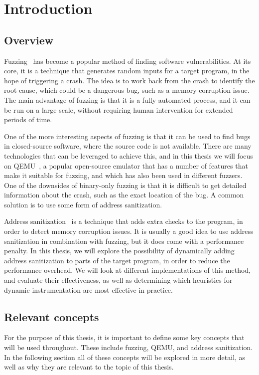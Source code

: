 
\chapter{Introduction}\label{chapter:introduction}

\section{Overview}
Fuzzing~\parencite{manes2019artscienceengineeringfuzzing} has become a popular method of finding software vulnerabilities.
At its core, it is a technique that generates random inputs for a target program, in the hope
of triggering a crash. The idea is to work back from the crash to identify the root cause, which could
be a dangerous bug, such as a memory corruption issue. The main advantage of fuzzing is that it is
a fully automated process, and it can be run on a large scale, without requiring human intervention
for extended periods of time.

One of the more interesting aspects of fuzzing is that it can be used to find bugs in closed-source
software, where the source code is not available. There are many technologies that can be leveraged
to achieve this, and in this thesis we will focus on QEMU~\parencite{269444}, a popular open-source emulator that has
a number of features that make it suitable for fuzzing, and which has also been used in different
fuzzers. One of the downsides of binary-only fuzzing is that it is difficult to get detailed information
about the crash, such as the exact location of the bug. A common solution is to use some form of
address sanitization.

Address sanitization~\parencite{10.5555/2342821.2342849} is a technique that adds extra checks to the program, in order to 
detect memory corruption issues. It is usually a good idea to use address sanitization in combination with fuzzing,
but it does come with a performance penalty. In this thesis, we will explore the possibility of dynamically
adding address sanitization to parts of the target program, in order to reduce the performance overhead. We
will look at different implementations of this method, and evaluate their effectiveness, as well as
determining which heuristics for dynamic instrumentation are most effective in practice.

\section{Relevant concepts}
For the purpose of this thesis, it is important to define some key concepts that will be used throughout.
These include fuzzing, QEMU, and address sanitization. In the following section all of these concepts will be
explored in more detail, as well as why they are relevant to the topic of this thesis.

